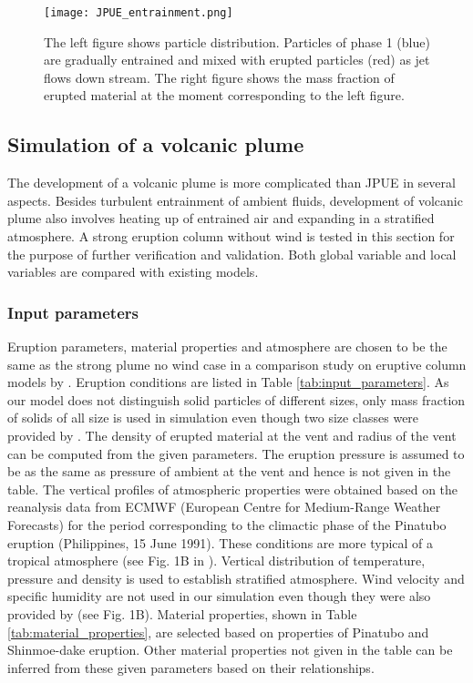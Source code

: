 \documentclass[gmd, manuscript]{copernicus}
\begin{document}
\begin{figure}
\texttt{[image: JPUE\_entrainment.png]}
\caption{The left figure shows particle distribution. Particles of phase 1 (blue) are gradually entrained and mixed with erupted particles (red) as jet flows down stream. The right figure shows the mass fraction of erupted material at the moment corresponding to the left figure.}
\label{fig:Turb_mixing}
\end{figure}

\subsection{Simulation of a volcanic plume}
The development of a volcanic plume is more complicated than JPUE in several aspects. Besides turbulent entrainment of ambient fluids, development of volcanic plume also involves heating up of entrained air and expanding in a stratified atmosphere. A strong eruption column without wind is tested in this section for the purpose of further verification and validation.
Both global variable and local variables are compared with existing models.

\subsubsection{Input parameters}
Eruption parameters, material properties and atmosphere are chosen to be the same as the strong plume no wind case in a comparison study on eruptive column models by \citet {costa2016results}. Eruption conditions are listed in Table \ref{tab:input_parameters}. As our model does not distinguish solid particles of different sizes, only mass fraction of solids of all size is used in simulation even though two size classes were provided by \citet {costa2016results}. The density of erupted material at the vent and radius of the vent can be computed from the given parameters. The eruption pressure is assumed to be as the same as pressure of ambient at the vent and hence is not given in the table. The vertical profiles of atmospheric properties were obtained based on the reanalysis data from ECMWF (European Centre for Medium-Range Weather Forecasts) for the period corresponding to the climactic phase of the Pinatubo eruption (Philippines, 15 June 1991). These conditions are more typical of a tropical atmosphere (see Fig. 1B in \citep{costa2016results}). 
Vertical distribution of temperature, pressure and density is used to establish stratified atmosphere. Wind velocity and specific humidity are not used in our simulation even though they were also provided by \citet{costa2016results} (see Fig. 1B). Material properties, shown in Table \ref{tab:material_properties}, are selected based on properties of Pinatubo and Shinmoe-dake eruption. Other material properties not given in the table can be inferred from these given parameters based on their relationships.
\end{document}
